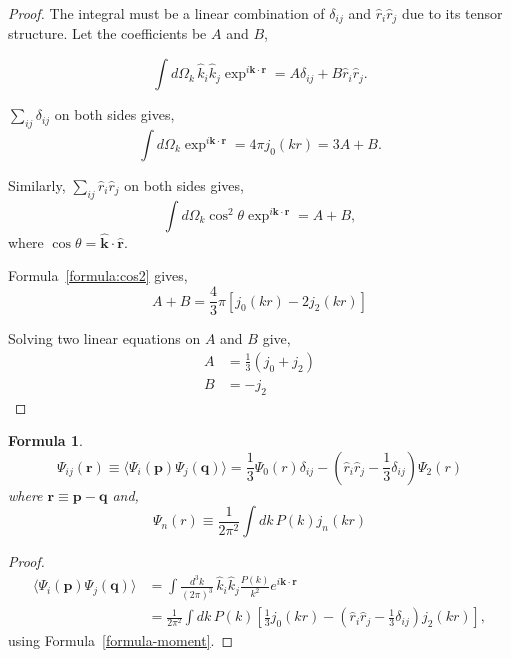 \documentclass[a4paper,11pt]{article}
\newtheorem{formula}{Formula}[section]
\begin{document}
\begin{proof}
  The integral must be a linear combination of $\delta_{ij}$ and
  $\hat{r}_i \hat{r}_j$ due to its tensor structure. Let the coefficients
  be $A$ and $B$,

  \begin{equation}
    \int\! d\Omega_k \, \hat{k}_i \hat{k}_j \exp^{i\bm{k}\cdot\bm{r}}
    = A \delta_{ij} + B \hat{r}_i \hat{r}_j.
  \end{equation}

   $\sum_{ij} \delta_{ij}$ on both sides gives,
  \begin{equation}
    \int \! d\Omega_k \exp^{i\bm{k}\cdot\bm{r}} = 4 \pi j_0(kr)
    = 3 A + B.
  \end{equation}

   Similarly, $\sum_{ij} \hat{r}_i \hat{r}_j$ on both sides gives,
  \begin{equation}
    \int \! d\Omega_k \cos^2 \theta \exp^{i\bm{k}\cdot\bm{r}}
      = A + B,
  \end{equation}
  where $\cos\theta = \hat{\bm{k}} \cdot \hat{\bm{r}}$.

  Formula~\ref{formula:cos2} gives,
  \begin{equation}
    A + B = \frac{4}{3}\pi \left[ j_0(kr) - 2 j_2(kr) \right]
  \end{equation}

  Solving two linear equations on $A$ and $B$ give,
  \begin{align}
    A &= \frac{1}{3} (j_0 + j_2)\\
    B &= - j_2
  \end{align}    
\end{proof}

%
%
\begin{formula}
  \begin{equation}
    \Psi_{ij} (\bm{r}) \equiv \langle \Psi_i(\bm{p}) \Psi_j(\bm{q}) \rangle =
    \frac{1}{3} \Psi_0(r) \delta_{ij} - \left( \hat{r}_i \hat{r}_j - \frac{1}{3} \delta_{ij} \right) \Psi_2(r)
  \end{equation}
  where $\bm{r} \equiv \bm{p} - \bm{q}$ and,
  \begin{equation}
    \Psi_n(r) \equiv \frac{1}{2\pi^2} \int \! dk \, P(k) j_n(kr)
  \end{equation}
\end{formula}

\begin{proof}
  \begin{equation}
    \begin{split}
      \langle \Psi_i(\bm{p}) \Psi_j(\bm{q}) \rangle &=
      \int \! \frac{d^3 k}{(2\pi)^3} \,
        \hat{k}_i \hat{k}_j \frac{P(k)}{k^2} e^{i\bm{k}\cdot\bm{r}}\\
      &= \frac{1}{2\pi^2} \int\! dk \, P(k) \left[
         \frac{1}{3} j_0(kr) - \left( \hat{r}_i \hat{r}_j - \frac{1}{3}\delta_{ij} \right) j_2(kr) \right],
    \end{split}
  \end{equation}
  using Formula~\ref{formula-moment}.
\end{proof}
\end{document}
